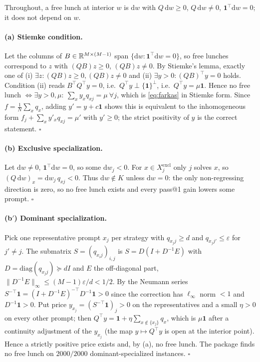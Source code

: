 Throughout, a free lunch at interior $w$ is $\mathrm dw$ with
$Q\,\mathrm dw\ge0$, $Q\,\mathrm dw\ne0$, $\mathbf 1^\top\mathrm dw=0$; it does not
depend on $w$.

\paragraph{(a) Stiemke condition.}
Let the columns of $B\in\mathbb{R}^{M\times(M-1)}$ span $\{\mathrm dw:\mathbf 1^\top\mathrm
dw=0\}$, so free lunches correspond to $z$ with $(QB)z\ge0$, $(QB)z\ne0$. By
Stiemke's lemma, exactly one of (i) $\exists z:(QB)z\ge0,(QB)z\ne0$ and (ii)
$\exists y>0:(QB)^\top y=0$ holds. Condition (ii) reads $B^\top Q^\top y=0$, i.e.\
$Q^\top y\perp\{\mathbf 1\}^\perp$, i.e.\ $Q^\top y=\mu\mathbf 1$. Hence no free
lunch $\iff\exists y>0,\mu:\ \sum_x y_xq_{xj}=\mu\ \forall j$, which is
\eqref{eq:farkas} in Stiemke form. Since $f=\tfrac1N\sum_x q_x$, adding
$y'=y+c\mathbf 1$ shows this is equivalent to the inhomogeneous form
$f_j+\sum_x y'_xq_{xj}=\mu'$ with $y'\ge0$; the strict positivity of $y$ is the
correct statement. $\square$

\paragraph{(b) Exclusive specialization.}
Let $\mathrm dw\ne0$, $\mathbf 1^\top\mathrm dw=0$, so some $\mathrm dw_j<0$. For
$x\in X_j^{\mathrm{excl}}$ only $j$ solves $x$, so $(Q\,\mathrm
dw)_x=\mathrm dw_j\,q_{xj}<0$. Thus $\mathrm dw\notin K$ unless $\mathrm dw=0$:
the only non-regressing direction is zero, so no free lunch exists and every
pass@1 gain lowers some prompt. $\square$

\paragraph{(b$'$) Dominant specialization.}
Pick one representative prompt $x_j$ per strategy with $q_{x_jj}\ge d$ and
$q_{x_jj'}\le\varepsilon$ for $j'\ne j$. The submatrix $S=(q_{x_ij})_{i,j}$ is
$S=D(I+D^{-1}E)$ with $D=\mathrm{diag}(q_{x_jj})\succeq dI$ and $E$ the
off-diagonal part, $\|D^{-1}E\|_\infty\le(M-1)\varepsilon/d<1/2$. By the Neumann
series $S^{-\top}\mathbf 1=(I+D^{-1}E)^{-\top}D^{-1}\mathbf 1>0$ since the
correction has $\ell_\infty$ norm $<1$ and $D^{-1}\mathbf 1>0$. Put price
$y_{x_j}=(S^{-\top}\mathbf 1)_j>0$ on the representatives and a small $\eta>0$ on
every other prompt; then $Q^\top y=\mathbf 1+\eta\sum_{x\notin\{x_j\}}q_x$, which
is $\mu\mathbf 1$ after a continuity adjustment of the $y_{x_j}$ (the map
$y\mapsto Q^\top y$ is open at the interior point). Hence a strictly positive
price exists and, by (a), no free lunch. The package finds no free lunch on
$2000/2000$ dominant-specialized instances. $\square$

